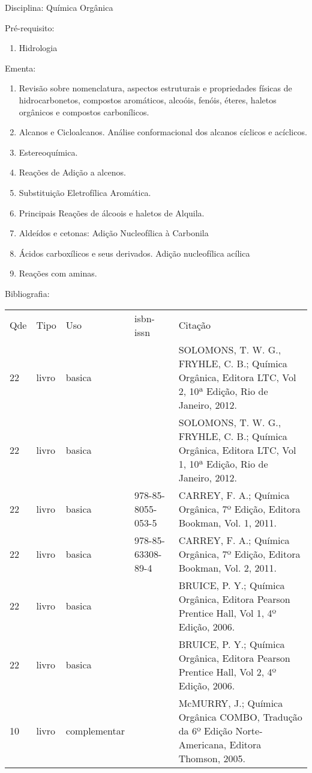 \documentclass[12pt,a4paper,twoside]{report}
\begin{document}
Disciplina: Química Orgânica

Pré-requisito:
\begin{enumerate}
\item Hidrologia
\end{enumerate}

Ementa:
\begin{enumerate}
\item Revisão sobre nomenclatura, aspectos estruturais e propriedades físicas de hidrocarbonetos, compostos aromáticos, alcoóis, fenóis, éteres, haletos orgânicos e compostos carbonílicos.
\item Alcanos e Cicloalcanos. Análise conformacional dos alcanos cíclicos e acíclicos.
\item Estereoquímica.
\item Reações de Adição a alcenos.
\item Substituição Eletrofílica Aromática.
\item Principais Reações de álcoois e haletos de Alquila.
\item Aldeídos e cetonas: Adição Nucleofílica à Carbonila
\item Ácidos carboxílicos e seus derivados. Adição nucleofílica acílica
\item Reações com aminas.
\end{enumerate}

Bibliografia:
\begin{tabular}{lllll}
Qde & Tipo & Uso & isbn-issn & Citação \\
22&livro&basica&&SOLOMONS, T. W. G., FRYHLE, C. B.; Química Orgânica, Editora LTC, Vol 2, 10ª Edição, Rio de Janeiro, 2012.\\
22&livro&basica&&SOLOMONS, T. W. G., FRYHLE, C. B.; Química Orgânica, Editora LTC, Vol 1, 10ª Edição, Rio de Janeiro, 2012.\\
22&livro&basica&978-85-8055-053-5&CARREY, F. A.; Química Orgânica, 7º Edição, Editora Bookman, Vol. 1, 2011.\\
22&livro&basica&978-85-63308-89-4&CARREY, F. A.; Química Orgânica, 7º Edição, Editora Bookman, Vol. 2, 2011.\\
22&livro&basica&&BRUICE, P. Y.; Química Orgânica, Editora Pearson Prentice Hall, Vol 1, 4º Edição, 2006.\\
22&livro&basica&&BRUICE, P. Y.; Química Orgânica, Editora Pearson Prentice Hall, Vol 2, 4º Edição, 2006.\\
10&livro&complementar&&McMURRY, J.; Química Orgânica COMBO, Tradução da 6º Edição Norte-Americana, Editora Thomson, 2005.\\
\end{tabular}
\end{document}
